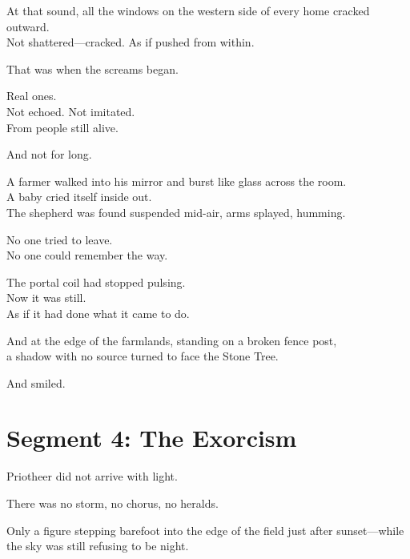 \documentclass[9pt]{article}
\begin{document}
\vspace{0.5em}
At that sound, all the windows on the western side of every home cracked outward.\\
Not shattered---cracked. As if pushed from within.

\vspace{0.5em}
That was when the screams began.

\vspace{0.5em}
Real ones.\\
Not echoed. Not imitated.\\
From people still alive.

\vspace{0.5em}
And not for long.

\vspace{0.5em}
A farmer walked into his mirror and burst like glass across the room.\\
A baby cried itself inside out.\\
The shepherd was found suspended mid-air, arms splayed, humming.

\vspace{0.5em}
No one tried to leave.\\
No one could remember the way.

\vspace{0.5em}
The portal coil had stopped pulsing.\\
Now it was still.\\
As if it had done what it came to do.

\vspace{0.5em}
And at the edge of the farmlands, standing on a broken fence post,\\
a shadow with no source turned to face the Stone Tree.

\vspace{0.5em}
And smiled.

\newpage

\section*{Segment 4: The Exorcism}

Priotheer did not arrive with light.

\vspace{0.5em}
There was no storm, no chorus, no heralds.

\vspace{0.5em}
Only a figure stepping barefoot into the edge of the field just after sunset---while the sky was still refusing to be night.
\end{document}

